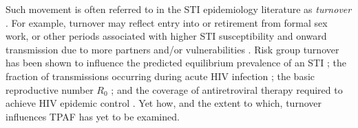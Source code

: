 Such movement is often referred to in the STI epidemiology literature as
\textit{turnover} \citep{Watts2010}.
For example, turnover may reflect entry into or retirement from formal sex work,
or other periods associated with higher STI susceptibility and onward transmission
due to more partners and/or vulnerabilities
\citep{Marston2006,Watts2010}.
Risk group turnover has been shown to
influence the predicted equilibrium prevalence of an STI \citep{Stigum1994,Zhang2012};
the fraction of transmissions occurring during acute HIV infection \citep{Zhang2012};
the basic reproductive number $R_0$ \citep{Henry2015}; and
the coverage of antiretroviral therapy required to achieve HIV epidemic control \citep{Henry2015}.
Yet how, and the extent to which, turnover influences TPAF has yet to be examined.



